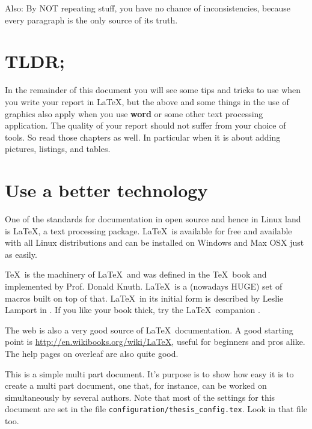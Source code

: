 Also: By NOT repeating stuff, you have no chance of inconsistencies, because every paragraph is the only source of its truth.

\section{TLDR;}

In the remainder of this document you will see some tips and tricks to use when you write your report in \LaTeX,
but the above and some things in the use of graphics also apply when you use \textbf{word} or some other text processing application. The quality of your report should not suffer from your choice of tools.
So read those chapters as well. In particular when it is about adding pictures, listings, and tables.

\section{Use a better technology}
One of the standards for documentation in open source and hence in
Linux land is \LaTeX, a text processing package. \LaTeX\ is available
for free and available with all Linux distributions and can be installed on Windows and Max OSX just as easily.

\TeX\ is the machinery of \LaTeX\ and was defined in the \TeX\ book
\cite{texbook} and implemented by
Prof. Donald Knuth. \LaTeX\ is a (nowadays HUGE) set of macros built
on top of that. \LaTeX\ in its initial form is described by Leslie
Lamport in \cite{latexbook}. If you like your book thick, try the
\LaTeX\ companion \cite{latexcompanion}.

The web is also a very good source of \LaTeX\ documentation. A good
starting point is \url{http://en.wikibooks.org/wiki/LaTeX}, useful for
beginners and pros alike. The help pages on overleaf are also quite good.

This is a simple multi part document. It's purpose is to show how easy it is
to create a multi part document, one that, for instance, can be worked on 
simultaneously by several authors. Note that most of the settings for
this document are set in the file \texttt{configuration/thesis\_config.tex}. 
Look in that file too.


